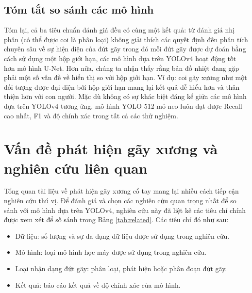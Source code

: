 \documentclass[../the.tex]{subfiles}
\begin{document}



\subsection{Tóm tắt so sánh các mô hình}

{\fontsize{13}{12} \selectfont
Tóm lại, cả ba tiêu chuẩn đánh giá đều có cùng một kết quả: từ đánh giá nhị phân (có thể được coi là phân loại) không giải thích các quyết định đến phân tích chuyên sâu về sự hiện diện của đứt gãy trong đó mỗi đứt gãy được dự đoán bằng cách sử dụng một hộp giới hạn, các mô hình dựa trên YOLOv4 hoạt động tốt hơn mô hình U-Net. Hơn nữa, chúng ta nhận thấy rằng bản đồ nhiệt đang gặp phải một số vấn đề về hiển thị so với hộp giới hạn. Ví dụ: coi gãy xương như một đối tượng được đại diện bởi hộp giới hạn mang lại kết quả dễ hiểu hơn và thân thiện hơn với con người. Mặc dù không có sự khác biệt đáng kể giữa các mô hình dựa trên YOLOv4 tương ứng, mô hình YOLO 512 mỏ neo luôn đạt được Recall cao nhất, F1 và độ chính xác trong tất cả các thử nghiệm.
}

\section{Vấn đề phát hiện gãy xương và nghiên cứu liên quan}
\label{sec:result_related}

{\fontsize{13}{12} \selectfont
Tổng quan tài liệu về phát hiện gãy xương cổ tay mang lại nhiều cách tiếp cận nghiên cứu thú vị. Để đánh giá và chọn các nghiên cứu quan trọng nhất để so sánh với mô hình dựa trên YOLOv4, nghiên cứu này đã liệt kê các tiêu chí chính được xem xét để số sánh trong Bảng \ref{tab:related}. Các tiêu chí đó như sau:
}

\begin {itemize}
  \item Dữ liệu: số lượng và sự đa dạng dữ liệu được sử dụng trong nghiên cứu.
  \item Mô hình: loại mô hình học máy được sử dụng trong nghiên cứu.
  \item Loại nhận dạng đứt gãy: phân loại, phát hiện hoặc phân đoạn đứt gãy.
  \item Kết quả: báo cáo kết quả về độ chính xác của mô hình.
\end {itemize}
\end{document}
